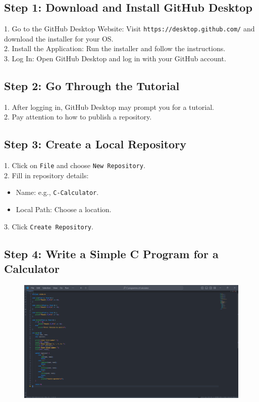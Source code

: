 \documentclass[a4paper,12pt]{article}
\begin{document}
\subsection*{Step 1: Download and Install GitHub Desktop}
1. Go to the GitHub Desktop Website: Visit \texttt{https://desktop.github.com/} and download the installer for your OS.\\
2. Install the Application: Run the installer and follow the instructions.\\
3. Log In: Open GitHub Desktop and log in with your GitHub account.

\subsection*{Step 2: Go Through the Tutorial}
1. After logging in, GitHub Desktop may prompt you for a tutorial.\\
2. Pay attention to how to publish a repository.

\subsection*{Step 3: Create a Local Repository}
1. Click on \texttt{File} and choose \texttt{New Repository}.\\
2. Fill in repository details: 
   \begin{itemize}
       \item Name: e.g., \texttt{C-Calculator}.
       \item Local Path: Choose a location.
   \end{itemize}
3. Click \texttt{Create Repository}.

\subsection*{Step 4: Write a Simple C Program for a Calculator}

\vspace{1 cm}
\begin{figure}[h!]
   \centering
    \includegraphics[width=0.5\linewidth]{C-calulator.png}
\end{figure}
\vspace{0.5 cm}
\end{document}
